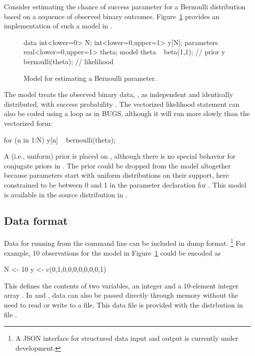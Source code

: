\documentclass[article]{jss}
\begin{document}
Consider estimating the chance of success parameter for a Bernoulli
distribution based on a sequence of observed binary outcomes.  
Figure~\ref{bernoulli-model.fig} provides an implementation of such a
model in .
%
\begin{figure}
\begin{Code}
data { 
  int<lower=0> N; 
  int<lower=0,upper=1> y[N];
} 
parameters {
  real<lower=0,upper=1> theta;
} 
model {
  theta ~ beta(1,1);     // prior
  y ~ bernoulli(theta);  // likelihood
}
\end{Code}
\caption{Model for estimating a Bernoulli parameter.}\label{bernoulli-model.fig}
\end{figure}
%
The model treats the observed binary data, , as
independent and identically distributed, with success probability
.  The vectorized likelihood statement can also be coded
using a loop as in BUGS, although it will run more slowly than the
vectorized form:
%
\begin{Code}
for (n in 1:N)
  y[n] ~ bernoulli(theta);
\end{Code}
%
A  (i.e., uniform) prior is placed on ,
although there is no special behavior for conjugate priors in
.  The prior could be dropped from the model altogether
because parameters start with uniform distributions on their support,
here constrained to be between 0 and 1 in the parameter declaration
for .  This model is available in the 
source distribution in
.



\subsection{Data format}

Data for running  from the command line can be included
in  dump format.%
%
\footnote{A JSON interface for structured data input and output is
  currently under development.}
%
For example, 10 observations for the
model in Figure~\ref{bernoulli-model.fig} could be encoded as
%
\begin{Code}
N <- 10
y <- c(0,1,0,0,0,0,0,0,0,1)
\end{Code}
%
This defines the contents of two variables, an integer  and a
10-element integer array .  In  and ,
data can also be passed directly through memory without the need to
read or write to a file.  This data file is provided with the
 distrbution in file
.
\end{document}
